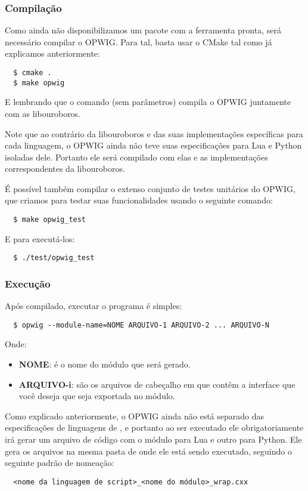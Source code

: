 \subsubsection{Compilação}
Como ainda não disponibilizamos um pacote com a ferramenta pronta, será necessário
compilar o OPWIG. Para tal, basta usar o CMake tal como já explicamos anteriormente:
\begin{verbatim}
  $ cmake .
  $ make opwig
\end{verbatim}
E lembrando que o comando  (sem parâmetros) compila o OPWIG juntamente com
as libouroboros.

Note que ao contrário da libouroboros e das suas implementações específicas para cada
linguagem, o OPWIG ainda não teve suas especificações para Lua e Python isoladas dele.
Portanto ele será compilado com elas e as implementações correspondentes da libouroboros.

É possível também compilar o extenso conjunto de testes unitários do OPWIG, que
criamos para testar suas funcionalidades usando o seguinte comando:
\begin{verbatim}
  $ make opwig_test
\end{verbatim}
E para executá-los:
\begin{verbatim}
  $ ./test/opwig_test
\end{verbatim}

\subsubsection{Execução}
Após compilado, executar o programa é simples:
\begin{verbatim}
  $ opwig --module-name=NOME ARQUIVO-1 ARQUIVO-2 ... ARQUIVO-N
\end{verbatim}
Onde:
\begin{itemize}
  \item \textbf{NOME}: é o nome do módulo que será gerado.
  \item \textbf{ARQUIVO-i}: são os arquivos de cabeçalho em \CXX{} que contêm a interface
    que você deseja que seja exportada no módulo.
\end{itemize}

Como explicado anteriormente, o OPWIG ainda não está separado das especificações
de linguagens de \script{}, e portanto ao ser executado ele obrigatoriamente
irá gerar um arquivo de código com o módulo para Lua e outro para Python. Ele gera
os arquivos na mesma pasta de onde ele está sendo executado, seguindo o seguinte
padrão de nomeação:
\begin{verbatim}
  <nome da linguagem de script>_<nome do módulo>_wrap.cxx
\end{verbatim}

